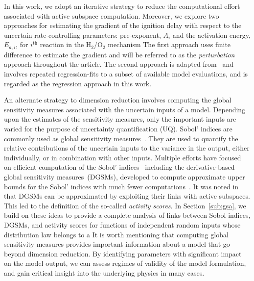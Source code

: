 In this work, we adopt an iterative strategy to reduce the computational effort
associated with active subspace computation. Moreover, we explore two
approaches for estimating the gradient of the ignition delay with respect to
the uncertain rate-controlling parameters: pre-exponent, $A_i$ and the
activation energy, $E_{a,i}$, for $i^{\text{th}}$ reaction in the H$_2$/O$_2$
mechanism  The first approach uses finite
difference to estimate the gradient and will be referred to as the
\emph{perturbation} approach throughout the article.  The second approach
is adapted from~\cite[Algorithm 1.2]{Constantine:2015} and involves
repeated regression-fits to a subset of available model evaluations, and is
regarded as the regression approach in this work.

An alternate strategy to dimension reduction involves computing the global
sensitivity measures associated with the uncertain inputs of a model. Depending
upon the estimates of the sensitivity measures, only the important inputs are
varied for the purpose of uncertainty quantification (UQ). Sobol' indices are
commonly used as global sensitivity measures~\cite{Sobol:2001}. They are
used to quantify the relative contributions of the uncertain inputs to the variance
in the output, either individually, or in combination with other inputs. 
Multiple efforts have focused on efficient computation of the Sobol' 
indices~\cite{Sudret:2008,Plischke:2013,Tissot:2015,Li:2016} including the 
derivative-based global sensitivity measures~(DGSMs), developed to
compute approximate upper bounds for the Sobol' indices with much fewer
computations~\cite{Sobol:2009, Lamboni:2013}. It was noted
in~\cite{Diaz:2016,Constantine:2017} that DGSMs can be approximated by
exploiting their links with active subspaces. This led to the definition of the 
so-called \emph{activity scores}. In Section~\ref{sub:gsa}, we build on these
ideas to provide a complete analysis of links between Sobol indices, DGSMs, and
activity scores for functions of independent random inputs whose distribution
law belongs to a  
It is worth mentioning that computing global sensitivity measures provides 
important information about a model that go beyond dimension reduction. By 
identifying parameters with significant impact on the model output, we can assess
regimes of validity of the model formulation, and gain critical insight into the
underlying physics in many cases. 

